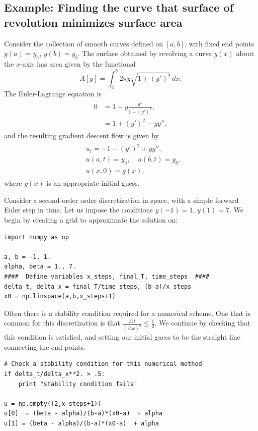 \subsection*{Example: Finding the curve that surface of revolution minimizes surface area}
Consider the collection of smooth curves defined on $[a,b]$, with fixed end points $y(a) = y_a$, $y(b) = y_b$. The surface obtained by revolving a curve $y(x)$ about the $x$-axis has area given by the functional 
\[A[y] = \int_a^b 2 \pi y \sqrt{1 + (y')^2} \, dx.
\]
The Euler-Lagrange equation is 
\begin{align}
	\begin{split}
	0 &= 1 - y \frac{y''}{1 + (y')^2} , \\
	&= 1 + (y')^2 - y y'',
	\end{split}\label{tv_images:SA_EL_equation}
\end{align}
and the resulting gradient descent flow is given by
\begin{align}
	\begin{split}
	&{ } u_t = -1 - (y')^2 + y y'', \\
	&{ } u(a,t) = y_a, \quad u(b,t) = y_b,\\
	&{ } u(x,0) = g(x),
	\end{split}\label{tv_images:SA_flow}
\end{align}
where $g(x)$ is an appropriate initial guess.

Consider a second-order order discretization in space, with a simple forward Euler step in time. Let us impose the conditions $y(-1) = 1$, $y(1) = 7$. We begin by creating a grid to approximate the solution on: 
\begin{lstlisting}
import numpy as np

a, b = -1, 1.
alpha, beta = 1., 7.
####  Define variables x_steps, final_T, time_steps  ####
delta_t, delta_x = final_T/time_steps, (b-a)/x_steps
x0 = np.linspace(a,b,x_steps+1)
\end{lstlisting}

Often there is a stability condition required for a numerical scheme. 
One that is common for this discretization is that $\frac{\triangle t}{(\triangle x)^2} \leq \frac{1}{2}$.  
We continue by checking that this condition is satisfied, and setting our initial guess to be the straight line connecting the end points. 

\begin{lstlisting}
# Check a stability condition for this numerical method
if delta_t/delta_x**2. > .5:
	print "stability condition fails"
	
u = np.empty((2,x_steps+1))
u[0]  = (beta - alpha)/(b-a)*(x0-a)  + alpha
u[1] = (beta - alpha)/(b-a)*(x0-a)  + alpha
\end{lstlisting}

